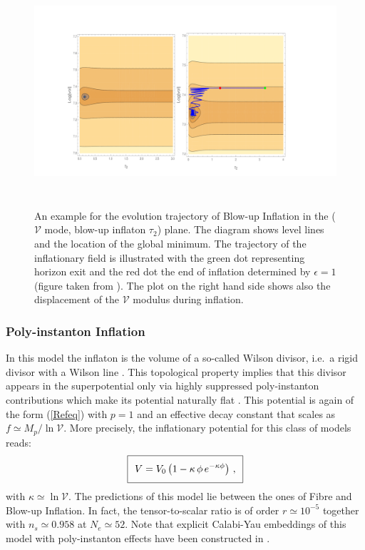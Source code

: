 \begin{figure}[H]
\begin{center}
\includegraphics[width=120mm,height=85mm]{Sections/Figures/BlowUp.pdf} 
\caption{An example for the evolution trajectory of Blow-up Inflation in the ($\mathcal{V}$ mode, blow-up inflaton $\tau_2$) plane. The diagram shows level lines and the location of the global minimum. The trajectory of the inflationary field is illustrated with the green dot representing horizon exit and the red dot the end of inflation determined by $\epsilon=1$ (figure taken from \cite{Cicoli:2017shd}). The plot on the right hand side shows also the displacement of the $\mathcal{V}$ modulus during inflation.} \label{Fig:BlowUp} 
\end{center}
\end{figure}




\subsubsection*{Poly-instanton Inflation}

In this model \cite{Cicoli:2011ct} the inflaton is the volume of a so-called Wilson divisor, i.e.~a rigid divisor with a Wilson line \cite{Blumenhagen:2012kz}. This topological property implies that this divisor appears in the superpotential only via highly suppressed poly-instanton contributions \cite{Blumenhagen:2008ji} which make its potential naturally flat \cite{Cicoli:2011yy}. This potential is again of the form (\ref{Refeq}) with $p=1$ and an effective decay constant that scales as $f \simeq  M_p/\ln\mathcal{V}$. More precisely, the inflationary potential for this class of models reads:
\begin{equation}
\setlength\fboxsep{0.25cm}
\setlength\fboxrule{0.4pt}
\boxed{
V = V_0\left(1-\kappa \,\phi\,e^{-\kappa\phi}\right)\,,
}
\end{equation}
with $\kappa \simeq \ln\mathcal{V}$. The predictions of this model lie between the ones of Fibre and Blow-up Inflation. In fact, the tensor-to-scalar ratio is of order $r\simeq 10^{-5}$ together with $n_s\simeq 0.958$ at $N_e\simeq 52$. Note that explicit Calabi-Yau embeddings of this model with poly-instanton effects have been constructed in \cite{Blumenhagen:2012ue, Gao:2013hn,Lust:2013kt}. 



